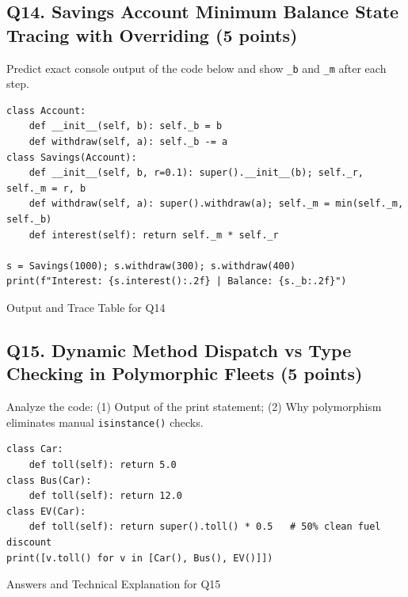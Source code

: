 \documentclass[11pt,a4paper]{article}
\begin{document}
\subsection*{Q14. Savings Account Minimum Balance State Tracing with Overriding (5 points)}
Predict exact console output of the code below and show \texttt{\_b} and \texttt{\_m} after each step.
\begin{lstlisting}
class Account:
    def __init__(self, b): self._b = b
    def withdraw(self, a): self._b -= a
class Savings(Account):
    def __init__(self, b, r=0.1): super().__init__(b); self._r, self._m = r, b
    def withdraw(self, a): super().withdraw(a); self._m = min(self._m, self._b)
    def interest(self): return self._m * self._r

s = Savings(1000); s.withdraw(300); s.withdraw(400)
print(f"Interest: {s.interest():.2f} | Balance: {s._b:.2f}")
\end{lstlisting}
\begin{answerbox}[height=1.5cm]{Output and Trace Table for Q14}\end{answerbox}
\vspace{-2mm}
\subsection*{Q15. Dynamic Method Dispatch vs Type Checking in Polymorphic Fleets (5 points)}
Analyze the code: (1) Output of the print statement; (2) Why polymorphism eliminates manual \lstinline|isinstance()| checks.
\begin{lstlisting}
class Car:
    def toll(self): return 5.0
class Bus(Car):
    def toll(self): return 12.0
class EV(Car):
    def toll(self): return super().toll() * 0.5   # 50% clean fuel discount
print([v.toll() for v in [Car(), Bus(), EV()]])
\end{lstlisting}
\begin{answerbox}[height=1.4cm]{Answers and Technical Explanation for Q15}\end{answerbox}
\newpage

\end{document}
